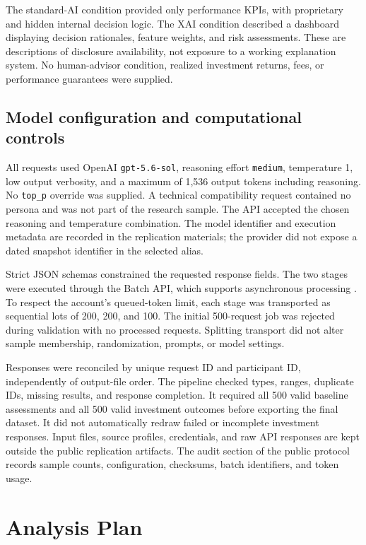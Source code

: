 \documentclass[11pt,a4paper]{article}
\begin{document}
The standard-AI condition provided only performance KPIs, with proprietary and hidden internal decision logic. The XAI condition described a dashboard displaying decision rationales, feature weights, and risk assessments. These are descriptions of disclosure availability, not exposure to a working explanation system. No human-advisor condition, realized investment returns, fees, or performance guarantees were supplied.

\subsection{Model configuration and computational controls}
All requests used OpenAI \texttt{gpt-5.6-sol}, reasoning effort \texttt{medium}, temperature 1, low output verbosity, and a maximum of 1,536 output tokens including reasoning. No \texttt{top\_p} override was supplied. A technical compatibility request contained no persona and was not part of the research sample. The API accepted the chosen reasoning and temperature combination. The model identifier and execution metadata are recorded in the replication materials; the provider did not expose a dated snapshot identifier in the selected alias.

Strict JSON schemas constrained the requested response fields. The two stages were executed through the Batch API, which supports asynchronous processing \citep{openaiBatch}. To respect the account's queued-token limit, each stage was transported as sequential lots of 200, 200, and 100. The initial 500-request job was rejected during validation with no processed requests. Splitting transport did not alter sample membership, randomization, prompts, or model settings.

Responses were reconciled by unique request ID and participant ID, independently of output-file order. The pipeline checked types, ranges, duplicate IDs, missing results, and response completion. It required all 500 valid baseline assessments and all 500 valid investment outcomes before exporting the final dataset. It did not automatically redraw failed or incomplete investment responses. Input files, source profiles, credentials, and raw API responses are kept outside the public replication artifacts. The audit section of the public protocol records sample counts, configuration, checksums, batch identifiers, and token usage.

\section{Analysis Plan}
\end{document}
